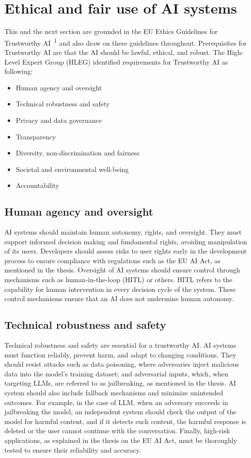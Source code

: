 \section{Ethical and fair use of AI systems}
This and the next section are grounded in the EU Ethics Guidelines for Trustworthy AI~\textsuperscript{1} and also draw on these guidelines throughout. Prerequisites for Trustworthy AI are that the AI should be lawful, ethical, and robust. The High-Level Expert Group (HLEG) identified requirements for Trustworthy AI as following:

\begin{itemize}
    \item{Human agency and oversight}
    \item{Technical robustness and safety}
    \item{Privacy and data governance}
    \item{Transparency}
    \item{Diversity, non-discrimination and fairness}
    \item{Societal and environmental well-being}
    \item{Accountability}
\end{itemize}

\subsection*{Human agency and oversight}
AI systems should maintain human autonomy, rights, and oversight. They must support informed decision making and fundamental rights, avoiding manipulation of its users. Developers should assess risks to user rights early in the development process to ensure compliance with regulations such as the EU AI Act, as mentioned in the thesis. Oversight of AI systems should ensure control through mechanisms such as human-in-the-loop (HITL) or others. HITL refers to the capability for human intervention in every decision cycle of the system. These control mechanisms ensure that an AI does not undermine human autonomy.

\subsection*{Technical robustness and safety}
Technical robustness and safety are essential for a trustworthy AI. AI systems must function reliably, prevent harm, and adapt to changing conditions. They should resist attacks such as data poisoning, where adversaries inject malicious data into the model’s training dataset; and adversarial inputs, which, when targeting LLMs, are referred to as jailbreaking, as mentioned in the thesis. AI system should also include fallback mechanisms and minimize unintended outcomes. For example, in the case of LLM, when an adversary succeeds in jailbreaking the model, an independent system should check the output of the model for harmful content, and if it detects such content, the harmful response is deleted or the user cannot continue with the conversation. Finally, high-risk applications, as explained in the thesis on the EU AI Act, must be thoroughly tested to ensure their reliability and accuracy.

